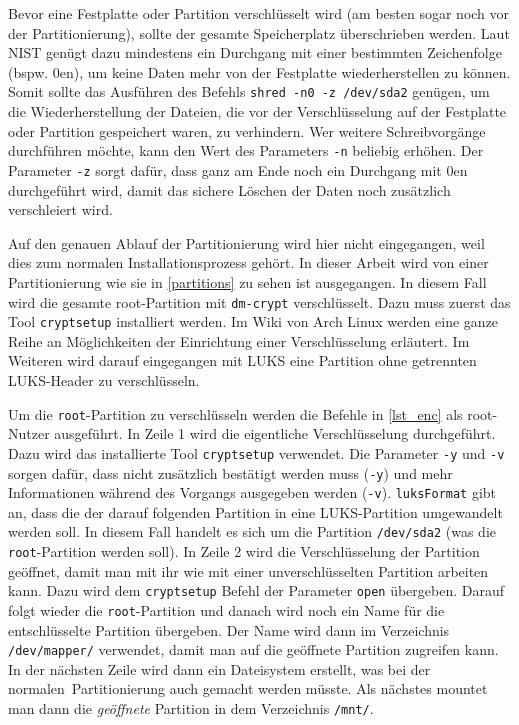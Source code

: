 

Bevor eine Festplatte oder Partition verschlüsselt wird {\small(am besten sogar noch vor der Partitionierung)}, sollte der gesamte Speicherplatz überschrieben werden. Laut \ac{NIST} genügt dazu mindestens ein Durchgang mit einer bestimmten Zeichenfolge {\small(bspw. 0en)}, um keine Daten mehr von der Festplatte wiederherstellen zu können.\cite[S. 7]{GuidelinesMediaSanitization2014} Somit sollte das Ausführen des Befehls \lstinline|shred -n0 -z /dev/sda2| genügen, um die Wiederherstellung der Dateien, die vor der Verschlüsselung auf der Festplatte oder Partition gespeichert waren, zu verhindern. Wer weitere Schreibvorgänge durchführen möchte, kann den Wert des Parameters \texttt{-n} beliebig erhöhen. Der Parameter \texttt{-z} sorgt dafür, dass ganz am Ende noch ein Durchgang mit 0en durchgeführt wird, damit das sichere Löschen der Daten noch zusätzlich verschleiert wird.\cite{ShredInvocationGNU}

Auf den genauen Ablauf der Partitionierung wird hier nicht eingegangen, weil dies zum normalen Installationsprozess gehört. In dieser Arbeit wird von einer Partitionierung wie sie in \autoref{partitions} zu sehen ist ausgegangen. In diesem Fall wird die gesamte root-Partition mit \texttt{dm-crypt} verschlüsselt. Dazu muss zuerst das Tool \texttt{cryptsetup} installiert werden. Im Wiki von Arch Linux werden eine ganze Reihe an Möglichkeiten der Einrichtung einer Verschlüsselung erläutert.\cite{DmcryptEncryptingEntire} Im Weiteren wird darauf eingegangen mit \ac{LUKS} eine Partition ohne getrennten \ac{LUKS}-Header zu verschlüsseln.

Um die \texttt{root}-Partition zu verschlüsseln werden die Befehle in \autoref{lst_enc} als root-Nutzer ausgeführt. In Zeile 1 wird die eigentliche Verschlüsselung durchgeführt. Dazu wird das installierte Tool \texttt{cryptsetup} verwendet. Die Parameter \texttt{-y} und \texttt{-v} sorgen dafür, dass nicht zusätzlich bestätigt werden muss {\small(\texttt{-y})} und mehr Informationen während des Vorgangs ausgegeben werden {\small(\texttt{-v})}. \texttt{luksFormat} gibt an, dass die der darauf folgenden Partition in eine \ac{LUKS}-Partition umgewandelt werden soll. In diesem Fall handelt es sich um die Partition \texttt{/dev/sda2} {\small(was die \texttt{root}-Partition werden soll)}. In Zeile 2 wird die Verschlüsselung der Partition geöffnet, damit man mit ihr wie mit einer unverschlüsselten Partition arbeiten kann. Dazu wird dem \texttt{cryptsetup} Befehl der Parameter \texttt{open} übergeben. Darauf folgt wieder die \texttt{root}-Partition und danach wird noch ein Name für die entschlüsselte Partition übergeben. Der Name wird dann im Verzeichnis \texttt{/dev/mapper/} verwendet, damit man auf die geöffnete Partition zugreifen kann. In der nächsten Zeile wird dann ein Dateisystem erstellt, was bei der \glqq normalen\grqq\ Partitionierung auch gemacht werden müsste. Als nächstes mountet man dann die \emph{geöffnete} Partition in dem Verzeichnis \texttt{/mnt/}.\cite{DmcryptEncryptingEntire}

